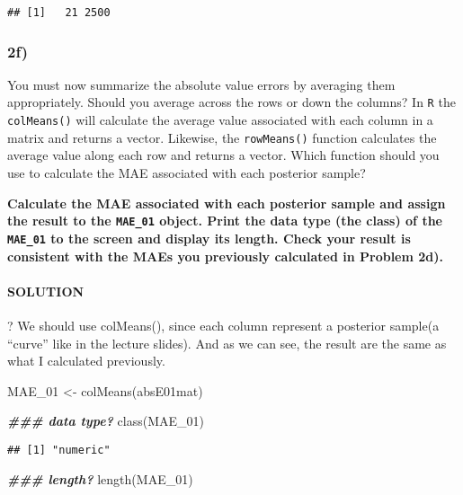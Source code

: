 \documentclass[
]{article}
\newenvironment{Shaded}{\begin{snugshade}}{\end{snugshade}}
\newcommand{\DocumentationTok}[1]{\textcolor[rgb]{0.56,0.35,0.01}{\textbf{\textit{#1}}}}
\newcommand{\FunctionTok}[1]{\textcolor[rgb]{0.00,0.00,0.00}{#1}}
\newcommand{\NormalTok}[1]{#1}
\newcommand{\OtherTok}[1]{\textcolor[rgb]{0.56,0.35,0.01}{#1}}
\begin{document}
\begin{verbatim}
## [1]   21 2500
\end{verbatim}

\hypertarget{f}{%
\subsubsection{2f)}\label{f}}

You must now summarize the absolute value errors by averaging them
appropriately. Should you average across the rows or down the columns?
In \texttt{R} the \texttt{colMeans()} will calculate the average value
associated with each column in a matrix and returns a vector. Likewise,
the \texttt{rowMeans()} function calculates the average value along each
row and returns a vector. Which function should you use to calculate the
MAE associated with each posterior sample?

\textbf{Calculate the MAE associated with each posterior sample and
assign the result to the \texttt{MAE\_01} object. Print the data type
(the class) of the \texttt{MAE\_01} to the screen and display its
length. Check your result is consistent with the MAEs you previously
calculated in Problem 2d).}

\hypertarget{solution-10}{%
\paragraph{SOLUTION}\label{solution-10}}

? We should use colMeans(), since each column represent a posterior
sample(a ``curve'' like in the lecture slides). And as we can see, the
result are the same as what I calculated previously.

\begin{Shaded}
\begin{Highlighting}[]
\NormalTok{MAE\_01 }\OtherTok{\textless{}{-}} \FunctionTok{colMeans}\NormalTok{(absE01mat)}

\DocumentationTok{\#\#\# data type?}
\FunctionTok{class}\NormalTok{(MAE\_01)}
\end{Highlighting}
\end{Shaded}

\begin{verbatim}
## [1] "numeric"
\end{verbatim}

\begin{Shaded}
\begin{Highlighting}[]
\DocumentationTok{\#\#\# length?}
\FunctionTok{length}\NormalTok{(MAE\_01)}
\end{Highlighting}
\end{Shaded}
\end{document}

